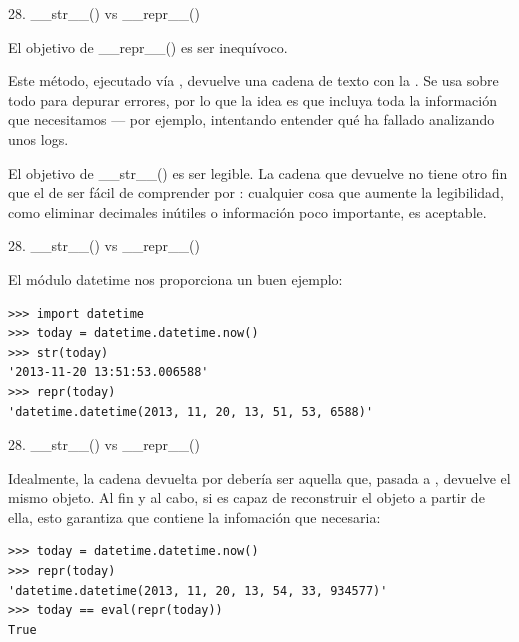 \documentclass[14pt]{beamer}
\begin{document}
\begin{frame}{28. \_\_str\_\_() vs \_\_repr\_\_()}

  \footnotesize
  \begin{alertblock}
    {\centering
      \small
      El objetivo de \_\_repr\_\_() es ser inequívoco.
    }
    \centering

    {Este método, ejecutado vía , devuelve una
      cadena de texto con la . Se usa sobre todo para depurar errores, por lo que la
      idea es que incluya toda la información que necesitamos --- por
      ejemplo, intentando entender qué ha fallado analizando unos
      logs.  }
  \end{alertblock}

  \begin{block}
    {\centering
      \small
      El objetivo de \_\_str\_\_() es ser legible.
    }
    \centering
    {\footnotesize
      La cadena que devuelve  no tiene otro fin que
      el de ser fácil de comprender por : cualquier
      cosa que aumente la legibilidad, como eliminar decimales
      inútiles o información poco importante, es aceptable.
    }
  \end{block}
\end{frame}

\begin{frame}[fragile]{28. \_\_str\_\_() vs \_\_repr\_\_()}
  \footnotesize
  \begin{exampleblock}
    {El módulo datetime nos proporciona un buen ejemplo:}
    \begin{lstlisting}
>>> import datetime
>>> today = datetime.datetime.now()
>>> str(today)
'2013-11-20 13:51:53.006588'
>>> repr(today)
'datetime.datetime(2013, 11, 20, 13, 51, 53, 6588)'
    \end{lstlisting}
  \end{exampleblock}
\end{frame}

\begin{frame}[fragile]{28. \_\_str\_\_() vs \_\_repr\_\_()}
  \small
  \begin{block}{}
    \centering
    Idealmente, la cadena devuelta por 
    debería ser aquella que, pasada a , devuelve el
    mismo objeto. Al fin y al cabo, si  es capaz de
    reconstruir el objeto a partir de ella, esto garantiza que
    contiene  la infomación que necesaria:
  \end{block}

  \footnotesize
  \begin{exampleblock} {}
    \begin{lstlisting}
>>> today = datetime.datetime.now()
>>> repr(today)
'datetime.datetime(2013, 11, 20, 13, 54, 33, 934577)'
>>> today == eval(repr(today))
True
    \end{lstlisting}
  \end{exampleblock}
\end{frame}
\end{document}
